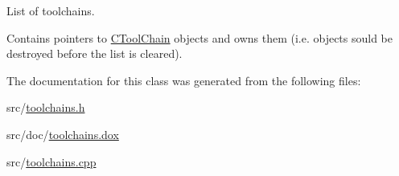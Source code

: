 List of toolchains. 

Contains pointers to \hyperlink{classCToolChain}{C\-Tool\-Chain} objects and owns them (i.\-e. objects sould be destroyed before the list is cleared). 

The documentation for this class was generated from the following files\-:\begin{DoxyCompactItemize}
\item 
src/\hyperlink{toolchains_8h}{toolchains.\-h}\item 
src/doc/\hyperlink{toolchains_8dox}{toolchains.\-dox}\item 
src/\hyperlink{toolchains_8cpp}{toolchains.\-cpp}\end{DoxyCompactItemize}
